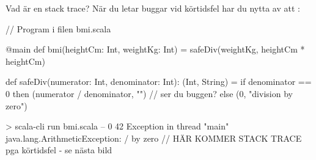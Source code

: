 




\begin{Slide}{Vad är en stack trace?}\SlideFontSmall
När du letar buggar vid körtidsfel har du nytta av att   :


  
\begin{Code}[numbers=left]
// Program i filen bmi.scala

@main 
def bmi(heightCm: Int, weightKg: Int) = 
  safeDiv(weightKg, heightCm * heightCm) 

def safeDiv(numerator: Int, denominator: Int): (Int, String) = 
  if denominator == 0 then (numerator / denominator, "")  // ser du buggen?
  else (0, "division by zero")

\end{Code}
\begin{REPL}
> scala-cli run bmi.scala -- 0 42
Exception in thread "main" java.lang.ArithmeticException: / by zero
        // HÄR KOMMER STACK TRACE pga körtidsfel - se nästa bild
\end{REPL}
\end{Slide}

